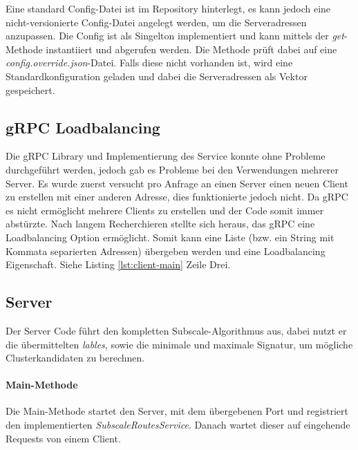 Eine standard Config-Datei ist im Repository hinterlegt, es kann jedoch eine nicht-versionierte Config-Datei angelegt
werden, um die Serveradressen anzupassen. Die Config ist als Singelton implementiert und kann mittels der
\textit{get}-Methode instantiiert und abgerufen werden. Die Methode prüft dabei auf eine
\textit{config.override.json}-Datei. Falls diese nicht vorhanden ist, wird eine Standardkonfiguration geladen und dabei
die Serveradressen als Vektor gespeichert.


\subsection{gRPC Loadbalancing}
Die gRPC Library und Implementierung des Service konnte ohne Probleme durchgeführt werden, jedoch gab es Probleme bei
den Verwendungen mehrerer Server. Es wurde zuerst versucht pro Anfrage an einen Server einen neuen Client zu erstellen
mit einer anderen Adresse, dies funktionierte jedoch nicht. Da gRPC es nicht ermöglicht mehrere Clients zu erstellen und
der Code somit immer abstürzte. Nach langem Recherchieren stellte sich heraus, das gRPC eine Loadbalancing Option
ermöglicht. Somit kann eine Liste (bzw. ein String mit Kommata separierten Adressen) übergeben werden und eine
Loadbalancing Eigenschaft. Siehe Listing \ref{lst:client-main} Zeile Drei.

\subsection{Server}
\label{sec:server}
Der Server Code führt den kompletten Subscale-Algorithmus aus, dabei nutzt er die übermittelten \textit{lables}, sowie
die minimale und maximale Signatur, um mögliche Clusterkandidaten zu berechnen.

\paragraph{Main-Methode}
Die Main-Methode startet den Server, mit dem übergebenen Port und registriert den implementierten
\textit{SubscaleRoutesService}. Danach wartet dieser auf eingehende Requests von einem Client.


